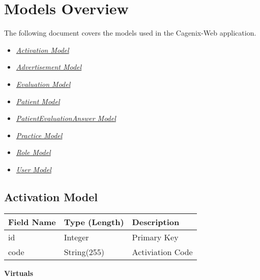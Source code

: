 \documentclass[letterpaper,10pt,english]{sphinxmanual}
\begin{document}
\chapter{Models Overview}
\label{dev-models:models-overview}\label{dev-models::doc}
The following document covers the models used in the Cagenix-Web application.
\begin{itemize}
\item {} 
{\hyperref[dev-models:activation-model-label]{\emph{Activation Model}}}

\item {} 
{\hyperref[dev-models:advertisement-model-label]{\emph{Advertisement Model}}}

\item {} 
{\hyperref[dev-models:evaluation-model-label]{\emph{Evaluation Model}}}

\item {} 
{\hyperref[dev-models:patient-model-label]{\emph{Patient Model}}}

\item {} 
{\hyperref[dev-models:patientevaluationanswer-model-label]{\emph{PatientEvaluationAnswer Model}}}

\item {} 
{\hyperref[dev-models:practice-model-label]{\emph{Practice Model}}}

\item {} 
{\hyperref[dev-models:role-model-label]{\emph{Role Model}}}

\item {} 
{\hyperref[dev-models:user-model-label]{\emph{User Model}}}

\end{itemize}


\section{Activation Model}
\label{dev-models:activation-model}\label{dev-models:activation-model-label}
\begin{tabulary}{\linewidth}{|L|L|L|}
\hline
\textsf{\relax 
Field Name
} & \textsf{\relax 
Type (Length)
} & \textsf{\relax 
Description
}\\
\hline
id
 & 
Integer
 & 
Primary Key
\\

code
 & 
String(255)
 & 
Activiation Code
\\
\hline\end{tabulary}


\textbf{Virtuals}
\end{document}
